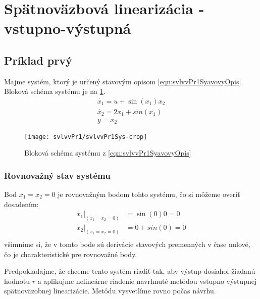 \documentclass[../main.tex]{subfiles}
\begin{document}
	\section{Spätnoväzbová linearizácia - vstupno-výstupná}
    \subsection{Príklad prvý}
	    Majme systém, ktorý je určený stavovým opisom \cref{eqn:svlvvPr1SyavovyOpis}. Bloková schéma systému je na \cref{fig:svlvvPr1BlockSchemaSystemu}.
	\begin{equation}
		\begin{gathered}
		\dot{x_1}  =u + \sin(x_1) x_2 \\
		\dot{x_2} = 2x_1 + sin(x_1) \\
		y = x_2
		\end{gathered}
		\label{eqn:svlvvPr1SyavovyOpis}
	\end{equation}
	\begin{figure}[h!]
		\centering
		\texttt{[image: svlvvPr1/svlvvPr1Sys-crop]}
		\caption{Bloková schéma systému z \cref{eqn:svlvvPr1SyavovyOpis}}
		\label{fig:svlvvPr1BlockSchemaSystemu}
	\end{figure}
    \subsubsection*{Rovnovažný stav systému}
    Bod $x_1 = x_2 = 0$ je rovnovažným bodom tohto systému, čo si môžeme overiť dosadením:
	\begin{equation*}
	    \begin{aligned}
            \dot{x_1}|_{(x_1 = x_2 = 0)} &= \sin(0) 0 = 0 \\
            \dot{x_2}|_{(x_1 = x_2 = 0)}  &= 0 + sin(0) = 0 \\
	    \end{aligned}
	    \label{eqn:svlvvPr1OverenieRB}
	\end{equation*}
	všimnime si, že v tomto bode sú derivácie stavových premenných v čase nulové, čo je charakteristické pre rovnovažné body.
	
	Predpokladajme, že chceme tento systém riadiť tak, aby výstup dosiahol žiadanú hodnotu $r$ a aplikujme nelineárne riadenie navrhnuté metódou vstupno výstupnej spätnoväzobnej linearizácie. Metódu vysvetlíme rovno počas návrhu. 
	
\end{document}
